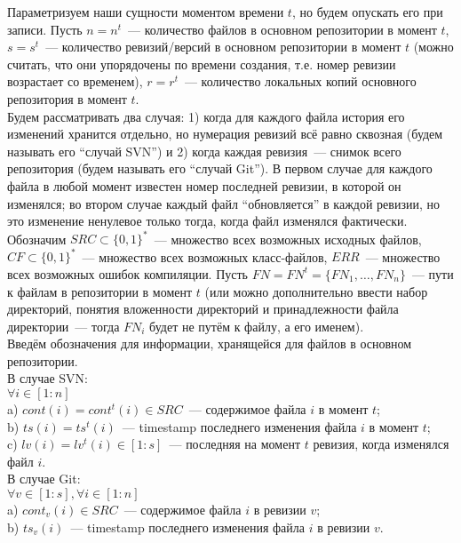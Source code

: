 Параметризуем наши сущности моментом времени $t$, но будем опускать его при записи. Пусть $n = n^t$~--- количество файлов в основном репозитории в момент  $t$, $s = s^t$~--- количество ревизий/версий в основном репозитории в момент $t$ (можно считать, что они упорядочены по времени создания, т.е. номер ревизии возрастает со временем), $r = r^t$~--- количество локальных копий основного репозитория в момент $t$.\\

Будем рассматривать два случая: 1) когда для каждого файла история его изменений хранится отдельно, но нумерация ревизий всё равно сквозная (будем называть его ``случай SVN'') и 2) когда каждая ревизия~--- снимок всего репозитория (будем называть его ``случай Git''). В первом случае для каждого файла в любой момент известен номер последней ревизии, в которой он изменялся; во втором случае каждый файл ``обновляется'' в каждой ревизии, но это изменение ненулевое только тогда, когда файл изменялся фактически.\\

Обозначим $SRC \subset \{0,1\}^*$~--- множество всех возможных исходных файлов, $CF \subset \{0,1\}^*$~--- множество всех возможных класс-файлов, $ERR$~--- множество всех возможных ошибок компиляции.
Пусть $FN = FN^t = \{FN_1, \dots, FN_n\}$~--- пути к файлам в репозитории в момент $t$ (или можно дополнительно ввести набор директорий, понятия вложенности директорий и принадлежности файла директории~--- тогда $FN_i$ будет не путём к файлу, а его именем).\\

Введём обозначения для информации, хранящейся для файлов в основном репозитории.\\
В случае SVN:\\
$\forall i \in [1:n]$\\
\indent a) $cont(i) = cont^t(i) \in SRC$~--- содержимое файла $i$ в момент $t$;\\
\indent b) $ts(i) = ts^t(i)$~--- timestamp последнего изменения файла $i$ в момент $t$;\\
\indent c) $lv(i) = lv^t(i) \in [1:s]$~--- последняя на момент $t$ ревизия, когда изменялся файл $i$.\\
В случае Git:\\
$\forall v \in [1:s], \forall i \in [1:n]$\\
\indent a) $cont_v(i) \in SRC$~--- содержимое файла $i$ в ревизии $v$;\\
\indent b) $ts_v(i)$~--- timestamp последнего изменения файла $i$ в ревизии $v$.\\

